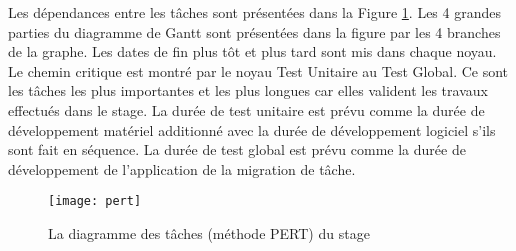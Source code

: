 Les dépendances entre les tâches sont présentées dans la Figure \ref{fig:pert}. 
Les 4 grandes parties du diagramme de Gantt sont présentées dans la figure par les 4 branches de la graphe.
Les dates de fin plus tôt et plus tard sont mis dans chaque noyau. Le chemin critique est montré par le noyau
Test Unitaire au Test Global. Ce sont les tâches les plus importantes et les plus longues car
elles valident les travaux effectués dans le stage. La durée de test unitaire est prévu comme la durée de développement
matériel additionné avec la durée de développement logiciel s'ils sont fait en séquence. La durée de test global est prévu
comme la durée de développement de l'application de la migration de tâche.

\begin{figure}[h]
	\centering
	\texttt{[image: pert]}
	\caption{La diagramme des tâches (méthode PERT) du stage}
	\label{fig:pert}
	\vspace{-2mm}
\end{figure}

